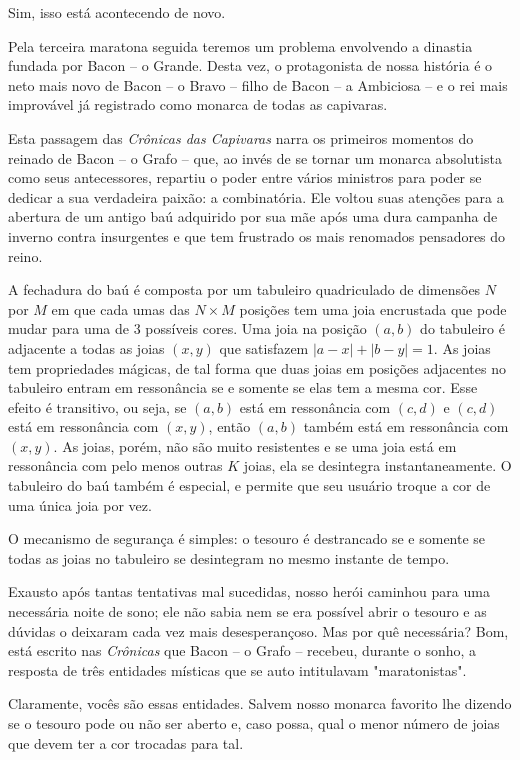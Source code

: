 Sim, isso está acontecendo de novo.

Pela terceira maratona seguida teremos um problema envolvendo a dinastia fundada por Bacon -- o Grande.
Desta vez, o protagonista de nossa história é o neto mais novo de Bacon -- o Bravo -- filho de Bacon -- a Ambiciosa -- e o rei mais improvável já registrado como monarca de todas as capivaras.

Esta passagem das \textit{Crônicas das Capivaras} narra os primeiros momentos do reinado de Bacon -- o Grafo -- que, ao invés de se tornar um monarca absolutista como seus antecessores, repartiu o poder entre vários ministros para poder se dedicar a sua verdadeira paixão: a combinatória.
Ele voltou suas atenções para a abertura de um antigo baú adquirido por sua mãe após uma dura campanha de inverno contra insurgentes e que tem frustrado os mais renomados pensadores do reino.

A fechadura do baú é composta por um tabuleiro quadriculado de dimensões $N$ por $M$ em que cada umas das $N \times M$ posições tem uma joia encrustada que pode mudar para uma de $3$ possíveis cores.
Uma joia na posição $(a,b)$ do tabuleiro é adjacente a todas as joias $(x,y)$ que satisfazem $|a - x| + |b - y| = 1$.
As joias tem propriedades mágicas, de tal forma que duas joias em posições adjacentes no tabuleiro entram em ressonância se e somente se elas tem a mesma cor.
Esse efeito é transitivo, ou seja, se $(a,b)$ está em ressonância com $(c,d)$ e $(c,d)$ está em ressonância com $(x,y)$, então $(a,b)$ também está em ressonância com $(x,y)$.
As joias, porém, não são muito resistentes e se uma joia está em ressonância com pelo menos outras $K$ joias, ela se desintegra instantaneamente.
O tabuleiro do baú também é especial, e permite que seu usuário troque a cor de uma única joia por vez.

O mecanismo de segurança é simples: o tesouro é destrancado se e somente se todas as joias no tabuleiro se desintegram no mesmo instante de tempo.

Exausto após tantas tentativas mal sucedidas, nosso herói caminhou para uma necessária noite de sono; ele não sabia nem se era possível abrir o tesouro e as dúvidas o deixaram cada vez mais desesperançoso.
Mas por quê necessária?
Bom, está escrito nas \textit{Crônicas} que Bacon -- o Grafo -- recebeu, durante o sonho, a resposta de três entidades místicas que se auto intitulavam "maratonistas".

Claramente, vocês são essas entidades. Salvem nosso monarca favorito lhe dizendo se o tesouro pode ou não ser aberto e, caso possa, qual o menor número de joias que devem ter a cor trocadas para tal.


